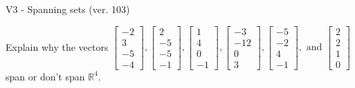 \begin{exercise}
  \begin{exerciseTitle}V3 - Spanning sets (ver. 103)\end{exerciseTitle}
  \begin{exerciseStatement}
    Explain why the vectors \(\left[\begin{array}{r}
-2 \\
3 \\
-5 \\
-4
\end{array}\right] , \left[\begin{array}{r}
2 \\
-5 \\
-5 \\
-1
\end{array}\right] , \left[\begin{array}{r}
1 \\
4 \\
0 \\
-1
\end{array}\right] , \left[\begin{array}{r}
-3 \\
-12 \\
0 \\
3
\end{array}\right] , \left[\begin{array}{r}
-5 \\
-2 \\
4 \\
-1
\end{array}\right] , \text{ and } \left[\begin{array}{r}
2 \\
2 \\
1 \\
0
\end{array}\right]\) span or don't span \(\mathbb{R}^4\). 
	



\end{exerciseStatement}
\end{exercise}
